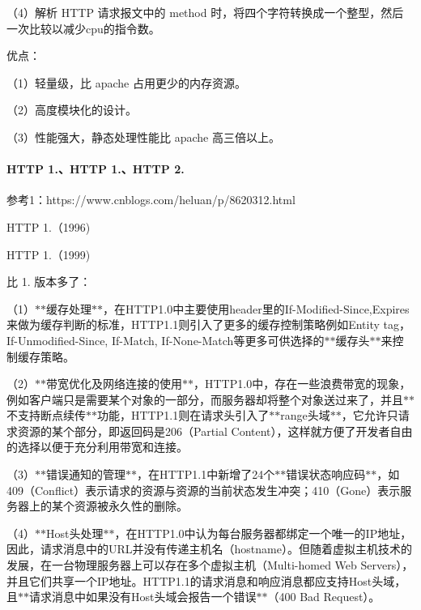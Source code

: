 （4）解析 H\+T\+TP 请求报文中的 method 时，将四个字符转换成一个整型，然后一次比较以减少cpu的指令数。

优点：

（1）轻量级，比 apache 占用更少的内存资源。

（2）高度模块化的设计。

（3）性能强大，静态处理性能比 apache 高三倍以上。 



\paragraph*{H\+T\+TP 1.、\+H\+T\+TP 1.、\+H\+T\+TP 2.}

参考1：https\+://www.cnblogs.\+com/heluan/p/8620312.html


\begin{DoxyEnumerate}
\item H\+T\+TP 1.（1996)
\item H\+T\+TP 1.（1999)
\end{DoxyEnumerate}

比 1. 版本多了：

（1）$\ast$$\ast$缓存处理$\ast$$\ast$，在\+H\+T\+T\+P1.0中主要使用header里的\+If-\/\+Modified-\/\+Since,Expires来做为缓存判断的标准，\+H\+T\+T\+P1.1则引入了更多的缓存控制策略例如\+Entity tag，\+If-\/\+Unmodified-\/\+Since, If-\/\+Match, If-\/\+None-\/\+Match等更多可供选择的$\ast$$\ast$缓存头$\ast$$\ast$来控制缓存策略。

（2）$\ast$$\ast$带宽优化及网络连接的使用$\ast$$\ast$，\+H\+T\+T\+P1.0中，存在一些浪费带宽的现象，例如客户端只是需要某个对象的一部分，而服务器却将整个对象送过来了，并且$\ast$$\ast$不支持断点续传$\ast$$\ast$功能，\+H\+T\+T\+P1.1则在请求头引入了$\ast$$\ast$range头域$\ast$$\ast$，它允许只请求资源的某个部分，即返回码是206（\+Partial Content），这样就方便了开发者自由的选择以便于充分利用带宽和连接。

（3）$\ast$$\ast$错误通知的管理$\ast$$\ast$，在\+H\+T\+T\+P1.1中新增了24个$\ast$$\ast$错误状态响应码$\ast$$\ast$，如409（\+Conflict）表示请求的资源与资源的当前状态发生冲突；410（\+Gone）表示服务器上的某个资源被永久性的删除。

（4）$\ast$$\ast$\+Host头处理$\ast$$\ast$，在\+H\+T\+T\+P1.0中认为每台服务器都绑定一个唯一的\+I\+P地址，因此，请求消息中的\+U\+R\+L并没有传递主机名（hostname）。但随着虚拟主机技术的发展，在一台物理服务器上可以存在多个虚拟主机（\+Multi-\/homed Web Servers），并且它们共享一个\+I\+P地址。\+H\+T\+T\+P1.1的请求消息和响应消息都应支持\+Host头域，且$\ast$$\ast$请求消息中如果没有\+Host头域会报告一个错误$\ast$$\ast$（400 Bad Request）。

